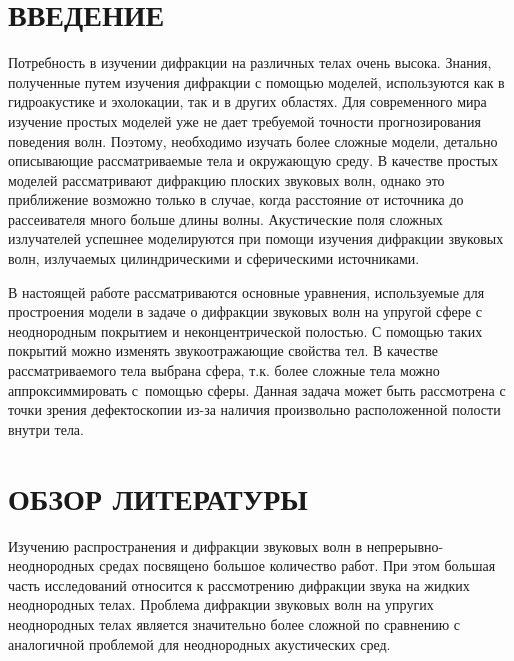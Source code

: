 


%

\setcounter{page}{2}
\thispagestyle {empty}
\renewcommand{\contentsname}{\centering СОДЕРЖАНИЕ}
\tableofcontents


\newpage
\section*{ВВЕДЕНИЕ}
Потребность в изучении дифракции на различных телах очень высока. Знания, полученные путем изучения дифракции с помощью моделей, используются как в гидроакустике и эхолокации, так и в других областях. Для современного мира изучение простых моделей уже не дает требуемой точности прогнозирования поведения волн. Поэтому, необходимо изучать более сложные модели, детально описывающие рассматриваемые тела и окружающую среду.
В качестве простых моделей рассматривают дифракцию плоских звуковых волн, однако это приближение возможно только в случае, когда расстояние от источника до рассеивателя много больше длины волны. Акустические поля сложных излучателей успешнее моделируются при помощи изучения дифракции звуковых волн, излучаемых цилиндрическими и сферическими источниками.

В настоящей работе рассматриваются основные уравнения, используемые для простроения модели в задаче о дифракции звуковых волн на упругой сфере с неоднородным покрытием и неконцентрической полостью. С помощью таких покрытий можно изменять звукоотражающие свойства тел. В качестве рассматриваемого тела выбрана сфера, т.к. более сложные тела можно аппроксиммировать с~помощью сферы. Данная задача может быть рассмотрена с точки зрения дефектоскопии из-за наличия произвольно расположенной полости внутри тела.


\newpage
\section{ОБЗОР ЛИТЕРАТУРЫ}
Изучению  распространения и дифракции звуковых волн в непрерывно-не\-од\-но\-род\-ных средах посвящено большое количество работ. При этом большая часть исследований относится к рассмотрению дифракции звука на жидких неоднородных телах. Проблема дифракции звуковых волн на упругих неоднородных телах является значительно более сложной по сравнению с аналогичной проблемой для неоднородных акустических сред.

